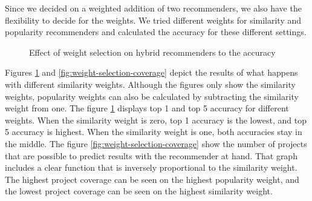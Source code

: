 Since we decided on a weighted addition of two recommenders, we also have the flexibility to decide for the weights. We tried different weights for similarity and popularity recommenders and calculated the accuracy for these different settings. 


\begin{figure}[htp]
	\centering
	
	\exampleA
	\exampleB
	\caption[Weight figure]{Effect of weight selection on hybrid recommenders to the accuracy}\label{fig:weight-selection}
\end{figure}

Figures \ref{fig:weight-selection} and \ref{fig:weight-selection-coverage}  depict the results of what happens with different similarity weights. Although the figures only show the similarity weights, popularity weights can also be calculated by subtracting the similarity weight from one. The figure \ref{fig:weight-selection} displays top 1 and top 5 accuracy for different weights. When the similarity weight is zero, top 1 accuracy is the lowest, and top 5 accuracy is highest. When the similarity weight is one, both accuracies stay in the middle. The figure \ref{fig:weight-selection-coverage} show the number of projects that are possible to predict results with the recommender at hand. That graph includes a clear function that is inversely proportional to the similarity weight. The highest project coverage can be seen on the highest popularity weight, and the lowest project coverage can be seen on the highest similarity weight.

